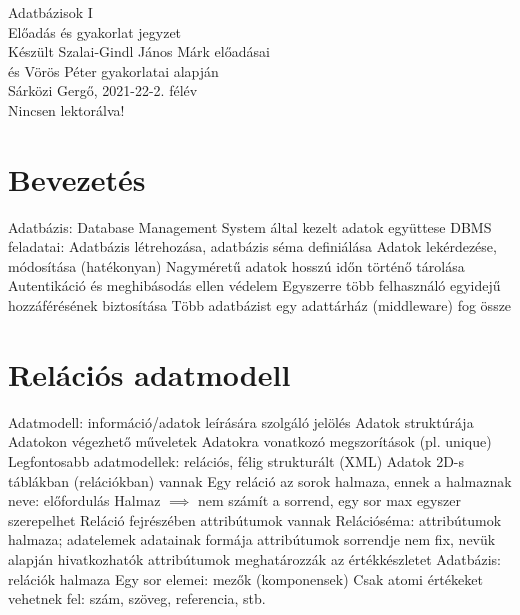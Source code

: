 \documentclass[12pt,a4paper]{article}
\begin{document}
\begin{center}
	\huge
	Adatbázisok I\\
	\vspace{1mm}
	\LARGE
	Előadás és gyakorlat jegyzet\\
	\vspace{5mm}
	\large
	Készült Szalai-Gindl János Márk előadásai\\
	és Vörös Péter gyakorlatai alapján\\
	\vspace{5mm}
	Sárközi Gergő, 2021-22-2. félév\\
	Nincsen lektorálva!
\end{center}

\tableofcontents

\pagebreak

\section{Bevezetés}

\begin{outline}
	\1 Adatbázis: Database Management System által kezelt adatok együttese
	\1 DBMS feladatai:
		\2 Adatbázis létrehozása, adatbázis séma definiálása
		\2 Adatok lekérdezése, módosítása (hatékonyan)
		\2 Nagyméretű adatok hosszú időn történő tárolása
		\2 Autentikáció és meghibásodás ellen védelem
		\2 Egyszerre több felhasználó egyidejű hozzáférésének biztosítása
	\1 Több adatbázist egy adattárház (middleware) fog össze
\end{outline}

\section{Relációs adatmodell}

\begin{outline}
	\1 Adatmodell: információ/adatok leírására szolgáló jelölés
		\2 Adatok struktúrája
		\2 Adatokon végezhető műveletek
		\2 Adatokra vonatkozó megszorítások (pl. unique)
	\1 Legfontosabb adatmodellek: relációs, félig strukturált (XML)
	\1 Adatok 2D-s táblákban (relációkban) vannak
		\2 Egy reláció az sorok halmaza, ennek a halmaznak neve: előfordulás
		\2 Halmaz $\implies$ nem számít a sorrend, egy sor max egyszer szerepelhet
	\1 Reláció fejrészében attribútumok vannak
		\2 Relációséma: attribútumok halmaza; adatelemek adatainak formája
		\2 attribútumok sorrendje nem fix, nevük alapján hivatkozhatók
		\2 attribútumok meghatározzák az értékkészletet
	\1 Adatbázis: relációk halmaza
	\1 Egy sor elemei: mezők (komponensek)
		\2 Csak atomi értékeket vehetnek fel: szám, szöveg, referencia, stb.
\end{outline}
\end{document}
